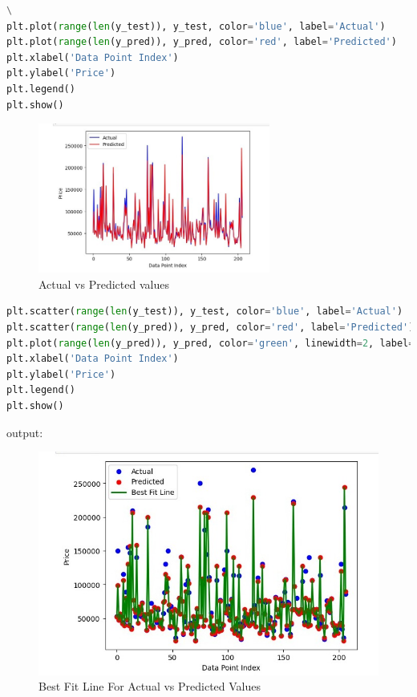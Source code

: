 \begin{lstlisting}[language=Python]
\
plt.plot(range(len(y_test)), y_test, color='blue', label='Actual')
plt.plot(range(len(y_pred)), y_pred, color='red', label='Predicted')
plt.xlabel('Data Point Index')
plt.ylabel('Price')
plt.legend()
plt.show()
\end{lstlisting}
 \begin{figure}[h]
\centering
\footnotesize
\includegraphics[width=3in]{31.png}
\caption{Actual vs Predicted values}
\label{fig:unevenlight}
\end{figure}
\vspace{2\baselineskip}
\begin{lstlisting}[language=Python]
plt.scatter(range(len(y_test)), y_test, color='blue', label='Actual')
plt.scatter(range(len(y_pred)), y_pred, color='red', label='Predicted')
plt.plot(range(len(y_pred)), y_pred, color='green', linewidth=2, label='Best Fit Line')
plt.xlabel('Data Point Index')
plt.ylabel('Price')
plt.legend()
plt.show()
\end{lstlisting}
output: 
\begin{figure}[h]
\centering
\footnotesize
\includegraphics[width=6in]{33.jpeg}
\caption{Best Fit Line For Actual vs Predicted Values}
\label{fig:unevenlight}
\end{figure} 
